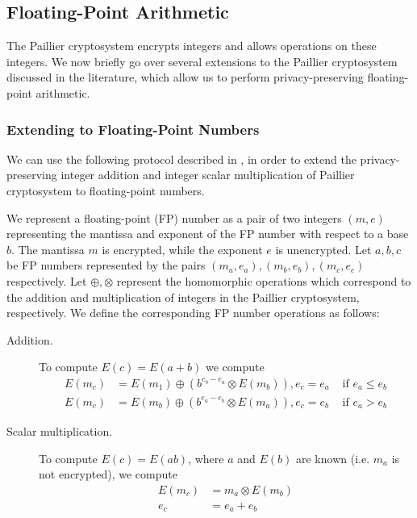 \subsection{Floating-Point Arithmetic}
\label{sec:fp_operations}
The Paillier cryptosystem encrypts integers and allows operations on these integers. We now briefly go over several extensions to the Paillier cryptosystem discussed in the literature, which allow us to perform privacy-preserving floating-point arithmetic.

\subsubsection{Extending to Floating-Point Numbers}
We can use the following protocol described in \cite{ziad_cryptoimg:_2016}, in order to extend the privacy-preserving integer addition and integer scalar multiplication of Paillier cryptosystem to floating-point numbers.

We represent a floating-point (FP) number as a pair of two integers $(m,e)$ representing the mantissa and exponent of the FP number with respect to a base $b$. The mantissa $m$ is encrypted, while the exponent $e$ is unencrypted.
Let $a,b,c$ be FP numbers represented by the pairs $(m_a,e_a),(m_b,e_b),(m_c,e_c)$ respectively. Let $\oplus,\otimes$ represent the homomorphic operations which correspond to the addition and multiplication of integers in the Paillier cryptosystem, respectively. We define the corresponding FP number operations as follows:
\begin{description}
  \item[Addition.]
    To compute $E(c)=E(a+b)$ we compute
    \begin{align*}
      E(m_c) &= E(m_1) \oplus (b^{e_b-e_a} \otimes E(m_b)), e_c = e_a & \text{ if } e_a \leq e_b \\
      E(m_c) &= E(m_b) \oplus (b^{e_a-e_b} \otimes E(m_a)), e_c = e_b & \text{ if } e_a > e_b
    \end{align*}
  \item[Scalar multiplication.]
    To compute $E(c) = E(ab)$, where $a$ and $E(b)$ are known (i.e. $m_a$ is not encrypted), we compute
    \begin{align*}
      E(m_c) &= m_a \otimes E(m_b)\\
      e_c &= e_a + e_b
    \end{align*}
\end{description}
